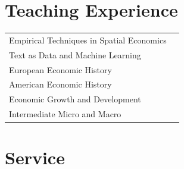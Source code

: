\documentclass[11pt,fullpage]{article}
\begin{document}

\section*{Teaching Experience}

\begin{tabular}{ll}
	Empirical Techniques in Spatial Economics \\
	Text as Data and Machine Learning \\
	European Economic History  \\
	American Economic History  \\ 
	Economic Growth and Development \\
	Intermediate Micro and Macro \\
\end{tabular}


\section*{Service}
\end{document}
